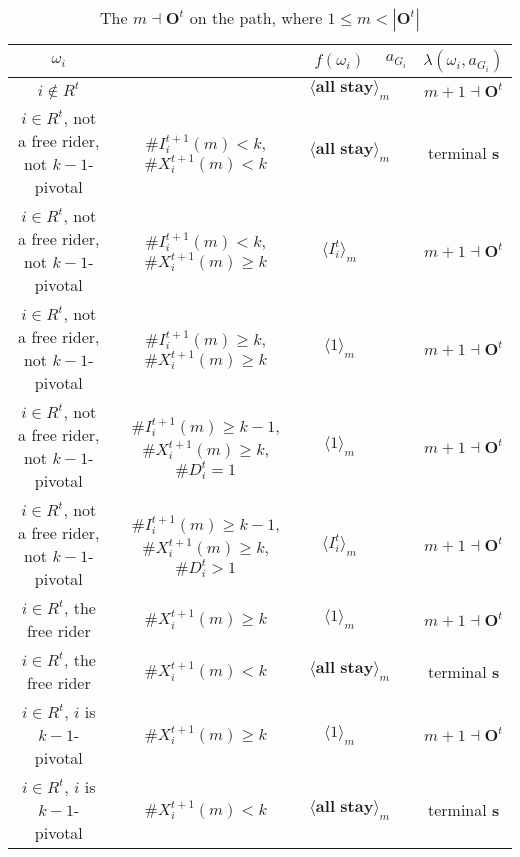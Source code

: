 \documentclass[12pt,letter]{article}
\newcommand{\Omicron}{\mathbf{O}}
\theoremstyle{definition}
\theoremstyle{remark}
\theoremstyle{claim}
\begin{document}
\begin{landscape}
\begin{table}[!htbp]
\caption{The $m\dashv\Omicron^t$ on the path, where $1\leq m < |\Omicron^t|$}
\label{table:eqm_path_ot1}
\begin{center}
\begin{tabular}{c c | c | c | c}
$\omega_i$ 	 & 	   &	$f(\omega_i)$  &	$a_{G_i}$ & $\lambda(\omega_i,a_{G_i})$ \\
\hline
\hline
$i\notin R^t$  	& 								& $\langle \textbf{all stay} \rangle_m$		&  			& $m+1\dashv \Omicron^t$ \\
$i\in R^t$, not a free rider, not $k-1$-pivotal		 	&  $\#I^{t+1}_i(m)< k$, $\#X^{t+1}_i(m)<k$			&  $\langle \textbf{all stay} \rangle_m$	& 	& terminal \textbf{s} \\
$i\in R^t$, not a free rider, not $k-1$-pivotal	  	& $\#I^{t+1}_i(m)<k$, $\#X^{t+1}_i(m)\geq k$		    & $\langle I^t_i \rangle_m$ 		&    			& $m+1\dashv \Omicron^t$ \\
$i\in R^t$, not a free rider, not $k-1$-pivotal	 	&  $\#I^{t+1}_i(m)\geq k$, $\#X^{t+1}_i(m)\geq k$	& $\langle 1 \rangle_m$ 	& 	& $m+1\dashv \Omicron^t$ \\
$i\in R^t$, not a free rider, not $k-1$-pivotal	 	&  $\#I^{t+1}_i(m)\geq k-1$, $\#X^{t+1}_i(m)\geq k$, $\#D^t_i=1$	& $\langle 1 \rangle_m$ 	& 	& $m+1\dashv \Omicron^t$ \\
$i\in R^t$, not a free rider, not $k-1$-pivotal	 	&  $\#I^{t+1}_i(m)\geq k-1$, $\#X^{t+1}_i(m)\geq k$, $\#D^t_i>1$	& $\langle I^t_i \rangle_m$ 	& 	& $m+1\dashv \Omicron^t$ \\
$i\in R^t$, the free rider  	&  $\#X^{t+1}_i(m)\geq k$ & $\langle 1 \rangle_m$ 		& 				  & $m+1\dashv \Omicron^t$ \\
$i\in R^t$, the free rider  	&  		$\#X^{t+1}_i(m)<k$					&  $\langle \textbf{all stay} \rangle_m$		& 										  & terminal \textbf{s} \\
$i\in R^t$, $i$ is $k-1$-pivotal  	&  $\#X^{t+1}_i(m)\geq k$ & $\langle 1 \rangle_m$ 	& 											 & $m+1\dashv \Omicron^t$ \\
$i\in R^t$, $i$ is $k-1$-pivotal  	&  	$\#X^{t+1}_i(m)<k$		&  $\langle \textbf{all stay} \rangle_m$	& 											 & terminal \textbf{s} \\
\hline
\end{tabular}
\end{center}
\end{table}


\end{landscape}
\end{document}

